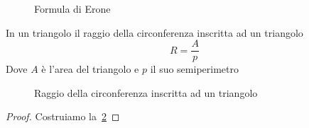 \begin{figure}
	\centering
	
	\caption{Formula di Erone}
	\label{fig:erone1}
\end{figure}
\begin{thm}\label{thm:raggiocirconferenzainscrittatriangolo}
In un triangolo il raggio della circonferenza inscritta ad un triangolo
\[R=\dfrac{A}{p}\]
Dove $A$ è l'area del triangolo e $p$ il suo semiperimetro
\end{thm}
\begin{figure}
	\centering
	
	\caption{Raggio della circonferenza inscritta ad un triangolo}
	\label{fig:raggiocirconferenzainscrittatriangolo}
\end{figure}
\begin{proof}
		Costruiamo la~\cref{fig:raggiocirconferenzainscrittatriangolo}
\end{proof}
